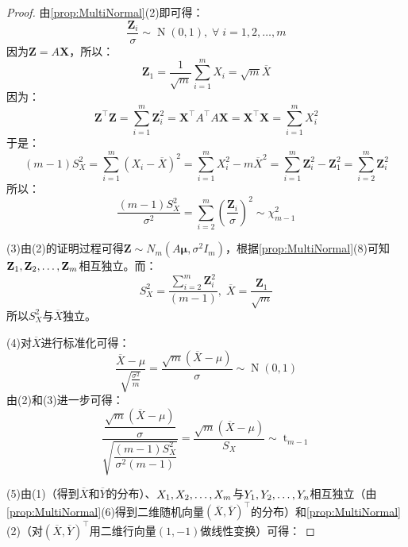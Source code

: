 \begin{proof}
	由\cref{prop:MultiNormal}(2)即可得：
	\begin{equation*}
		\frac{\mathbf{Z}_i}{\sigma}\sim \operatorname{N}(0,1),\;\forall\;i=1,2,\dots,m
	\end{equation*}
	因为$\mathbf{Z}=A\mathbf{X}$，所以：
	\begin{equation*}
		\mathbf{Z}_1=\frac{1}{\sqrt{m}}\sum_{i=1}^{m}X_i=\sqrt{m}\overline{X}
	\end{equation*}
	因为：
	\begin{equation*}
		\mathbf{Z}^{\top}\mathbf{Z}=\sum_{i=1}^{m}\mathbf{Z}_i^2=\mathbf{X}^{\top}A^{\top}A\mathbf{X}=\mathbf{X}^{\top}\mathbf{X}=\sum_{i=1}^{m}X_i^2
	\end{equation*}
	于是：
	\begin{equation*}
		(m-1)S_X^2=\sum_{i=1}^{m}(X_i-\overline{X})^2=\sum_{i=1}^{m}X_i^2-m\overline{X}^2=\sum_{i=1}^{m}\mathbf{Z}_i^2-\mathbf{Z}_1^2=\sum_{i=2}^{m}\mathbf{Z}_i^2
	\end{equation*}
	所以：
	\begin{equation*}
		\frac{(m-1)S_X^2}{\sigma^2}=\sum_{i=2}^{m}\left(\frac{\mathbf{Z}_i}{\sigma}\right)^2\sim\chi_{m-1}^2
	\end{equation*}\par
	(3)由(2)的证明过程可得$\mathbf{Z}\sim N_m(A\boldsymbol{\mu},\sigma^2I_m)$，根据\cref{prop:MultiNormal}(8)可知$\mathbf{Z}_1, \mathbf{Z}_2, \dots, \mathbf{Z}_{m}$相互独立。而：
	\begin{equation*}
		S_X^2=\frac{\sum\limits_{i=2}^{m}\mathbf{Z}_i^2}{(m-1)},\;\overline{X}=\frac{\mathbf{Z}_1}{\sqrt{m}}
	\end{equation*}
	所以$S_X^2$与$\overline{X}$独立。\par
	(4)对$\overline{X}$进行标准化可得：
	\begin{equation*}
		\frac{\overline{X}-\mu}{\sqrt{\frac{\sigma^2}{m}}}=\frac{\sqrt{m}(\overline{X}-\mu)}{\sigma}\sim\operatorname{N}(0,1)
	\end{equation*}
	由(2)和(3)进一步可得：
	\begin{equation*}
		\frac{\dfrac{\sqrt{m}(\overline{X}-\mu)}{\sigma}}{\sqrt{\dfrac{(m-1)S_X^2}{\sigma^2(m-1)}}}=\frac{\sqrt{m}(\overline{X}-\mu)}{S_X}\sim \operatorname{t}_{m-1}
	\end{equation*}\par
	(5)由(1)（得到$\overline{X}$和$\overline{Y}$的分布）、$X_1, X_2, \dots, X_{m}$与$Y_1, Y_2, \dots, Y_{n}$相互独立（由\cref{prop:MultiNormal}(6)得到二维随机向量$(\overline{X},\overline{Y})^{\top}$的分布）和\cref{prop:MultiNormal}(2)（对$(\overline{X},\overline{Y})^{\top}$用二维行向量$(1,-1)$做线性变换）可得：

\end{proof}
